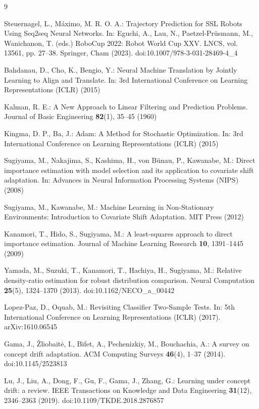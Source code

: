 \documentclass[runningheads]{llncs}
\begin{document}
\begin{thebibliography}{9}

Steuernagel, L., M\'aximo, M. R. O. A.: Trajectory Prediction for SSL Robots Using Seq2seq Neural Networks. In: Eguchi, A., Lau, N., Paetzel-Pr\"usmann, M., Wanichanon, T. (eds.) RoboCup 2022: Robot World Cup XXV. LNCS, vol. 13561, pp. 27--38. Springer, Cham (2023). doi:10.1007/978-3-031-28469-4\_4

Bahdanau, D., Cho, K., Bengio, Y.: Neural Machine Translation by Jointly Learning to Align and Translate. In: 3rd International Conference on Learning Representations (ICLR) (2015)

Kalman, R. E.: A New Approach to Linear Filtering and Prediction Problems. Journal of Basic Engineering \textbf{82}(1), 35--45 (1960)

Kingma, D. P., Ba, J.: Adam: A Method for Stochastic Optimization. In: 3rd International Conference on Learning Representations (ICLR) (2015)

Sugiyama, M., Nakajima, S., Kashima, H., von B\"unau, P., Kawanabe, M.: Direct importance estimation with model selection and its application to covariate shift adaptation. In: Advances in Neural Information Processing Systems (NIPS) (2008)

Sugiyama, M., Kawanabe, M.: Machine Learning in Non-Stationary Environments: Introduction to Covariate Shift Adaptation. MIT Press (2012)

Kanamori, T., Hido, S., Sugiyama, M.: A least-squares approach to direct importance estimation. Journal of Machine Learning Research \textbf{10}, 1391--1445 (2009)

Yamada, M., Suzuki, T., Kanamori, T., Hachiya, H., Sugiyama, M.: Relative density-ratio estimation for robust distribution comparison. Neural Computation \textbf{25}(5), 1324--1370 (2013). doi:10.1162/NECO\_a\_00442

Lopez-Paz, D., Oquab, M.: Revisiting Classifier Two-Sample Tests. In: 5th International Conference on Learning Representations (ICLR) (2017). arXiv:1610.06545

Gama, J., \v{Z}liobait\.{e}, I., Bifet, A., Pechenizkiy, M., Bouchachia, A.: A survey on concept drift adaptation. ACM Computing Surveys \textbf{46}(4), 1--37 (2014). doi:10.1145/2523813

Lu, J., Liu, A., Dong, F., Gu, F., Gama, J., Zhang, G.: Learning under concept drift: a review. IEEE Transactions on Knowledge and Data Engineering \textbf{31}(12), 2346--2363 (2019). doi:10.1109/TKDE.2018.2876857


\end{thebibliography}
\end{document}
